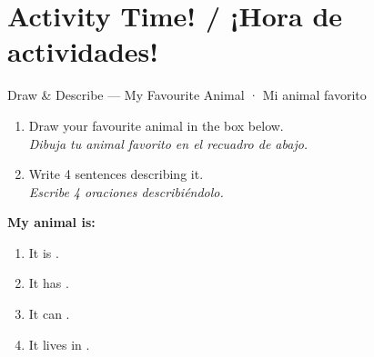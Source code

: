 
\section{Activity Time! / ¡Hora de actividades!}

\begin{activity}{Draw \& Describe — My Favourite Animal · Mi animal favorito}
\begin{enumerate}
  \item Draw your favourite animal in the box below. \\
        \textit{Dibuja tu animal favorito en el recuadro de abajo.}
  \item Write 4 sentences describing it. \\
        \textit{Escribe 4 oraciones describiéndolo.}
\end{enumerate}

\bigskip

\begin{center}
\end{center}

\bigskip
\textbf{My animal is:} \answerline[8cm]

\medskip
\begin{enumerate}
  \item It is \answerline[9.5cm].
  \item It has \answerline[9.2cm].
  \item It can \answerline[9.2cm].
  \item It lives in \answerline[8.5cm].
\end{enumerate}
\end{activity}

\vspace{14pt}

